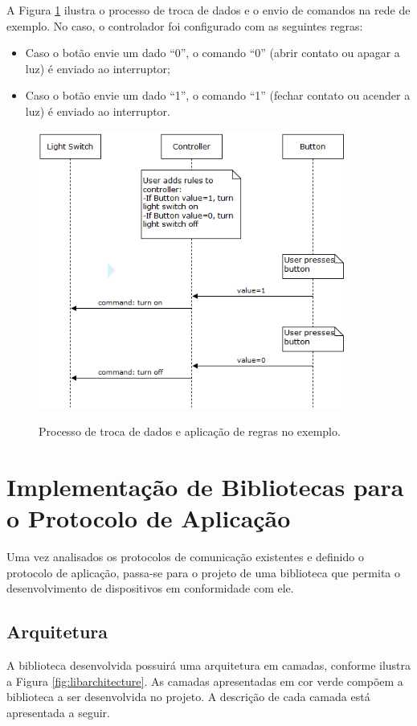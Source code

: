 A Figura \ref{fig:exemplo_dados} ilustra o processo de troca de dados e o envio de comandos na rede de exemplo. No caso, o controlador foi configurado com as seguintes regras:
\begin{itemize}
	\item Caso o botão envie um dado ``0'', o comando ``0'' (abrir contato ou apagar a luz) é enviado ao interruptor;
	\item Caso o botão envie um dado ``1'', o comando ``1'' (fechar contato ou acender a luz) é enviado ao interruptor.
\end{itemize}

\begin{figure}[hp]
	\centering
	\caption{Processo de troca de dados e aplicação de regras no exemplo.}
	\includegraphics[width=0.9\textwidth]{imagens/exemplo_dados.png}
 	\label{fig:exemplo_dados}
\end{figure}

\clearpage

\section{Implementação de Bibliotecas para o Protocolo de Aplicação} \label{sec:implsens}
Uma vez analisados os protocolos de comunicação existentes e definido o protocolo de aplicação, passa-se para o projeto de uma biblioteca que permita o desenvolvimento de dispositivos em conformidade com ele.

\subsection{Arquitetura}
A biblioteca desenvolvida possuirá uma arquitetura em camadas, conforme ilustra a Figura \ref{fig:libarchitecture}. As camadas apresentadas em cor verde compõem a biblioteca a ser desenvolvida no projeto. A descrição de cada camada está apresentada a seguir.

